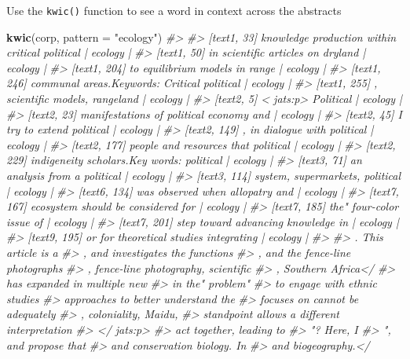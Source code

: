 \documentclass[author-year, review, 11pt]{components/elsarticle} %
\newenvironment{Shaded}{\begin{snugshade}}{\end{snugshade}}
\newcommand{\CommentTok}[1]{\textcolor[rgb]{0.56,0.35,0.01}{\textit{#1}}}
\newcommand{\DataTypeTok}[1]{\textcolor[rgb]{0.13,0.29,0.53}{#1}}
\newcommand{\KeywordTok}[1]{\textcolor[rgb]{0.13,0.29,0.53}{\textbf{#1}}}
\newcommand{\NormalTok}[1]{#1}
\newcommand{\StringTok}[1]{\textcolor[rgb]{0.31,0.60,0.02}{#1}}
\begin{document}
Use the \texttt{kwic()} function to see a word in context across the
abstracts

\begin{Shaded}
\begin{Highlighting}[]
\KeywordTok{kwic}\NormalTok{(corp, }\DataTypeTok{pattern =} \StringTok{"ecology"}\NormalTok{)}
\CommentTok{#>                                                                         }
\CommentTok{#>   [text1, 33] knowledge production within critical political | ecology |}
\CommentTok{#>   [text1, 50]              in scientific articles on dryland | ecology |}
\CommentTok{#>  [text1, 204]                 to equilibrium models in range | ecology |}
\CommentTok{#>  [text1, 246]    communal areas.Keywords: Critical political | ecology |}
\CommentTok{#>  [text1, 255]                 , scientific models, rangeland | ecology |}
\CommentTok{#>    [text2, 5]                            < jats:p> Political | ecology |}
\CommentTok{#>   [text2, 23]        manifestations of political economy and | ecology |}
\CommentTok{#>   [text2, 45]                      I try to extend political | ecology |}
\CommentTok{#>  [text2, 149]                   , in dialogue with political | ecology |}
\CommentTok{#>  [text2, 177]            people and resources that political | ecology |}
\CommentTok{#>  [text2, 229]      indigeneity scholars.Key words: political | ecology |}
\CommentTok{#>   [text3, 71]                   an analysis from a political | ecology |}
\CommentTok{#>  [text3, 114]                system, supermarkets, political | ecology |}
\CommentTok{#>  [text6, 134]                was observed when allopatry and | ecology |}
\CommentTok{#>  [text7, 167]             ecosystem should be considered for | ecology |}
\CommentTok{#>  [text7, 185]                       the" four-color issue of | ecology |}
\CommentTok{#>  [text7, 201]             step toward advancing knowledge in | ecology |}
\CommentTok{#>  [text9, 195]         or for theoretical studies integrating | ecology |}
\CommentTok{#>                                              }
\CommentTok{#>  . This article is a                         }
\CommentTok{#>  , and investigates the functions            }
\CommentTok{#>  , and the fence-line photographs            }
\CommentTok{#>  , fence-line photography, scientific        }
\CommentTok{#>  , Southern Africa</                         }
\CommentTok{#>  has expanded in multiple new                }
\CommentTok{#>  in the" problem"                            }
\CommentTok{#>  to engage with ethnic studies               }
\CommentTok{#>  approaches to better understand the         }
\CommentTok{#>  focuses on cannot be adequately             }
\CommentTok{#>  , coloniality, Maidu,                       }
\CommentTok{#>  standpoint allows a different interpretation}
\CommentTok{#>  </ jats:p>                                  }
\CommentTok{#>  act together, leading to                    }
\CommentTok{#>  "? Here, I                                  }
\CommentTok{#>  ", and propose that                         }
\CommentTok{#>  and conservation biology. In                }
\CommentTok{#>  and biogeography.</}
\end{Highlighting}
\end{Shaded}
\end{document}
